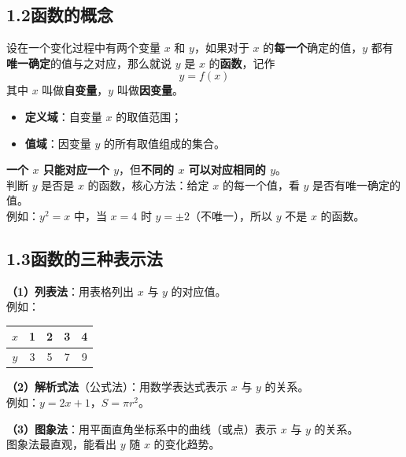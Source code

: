 \documentclass[12pt, a4paper]{ctexart}
\begin{document}
\subsection*{1.2\quad 函数的概念}

\begin{knowledgebox}[什么是函数]
设在一个变化过程中有两个变量 $x$ 和 $y$，如果对于 $x$ 的\textbf{每一个}确定的值，$y$ 都有\textbf{唯一确定}的值与之对应，那么就说 $y$ 是 $x$ 的\textbf{函数}，记作
\[
  y = f(x)
\]
其中 $x$ 叫做\textbf{自变量}，$y$ 叫做\textbf{因变量}。
\begin{itemize}[leftmargin=2em]
  \item \textbf{定义域}：自变量 $x$ 的取值范围；
  \item \textbf{值域}：因变量 $y$ 的所有取值组成的集合。
\end{itemize}
\end{knowledgebox}

\begin{warnbox}
\textbf{一个 $x$ 只能对应一个 $y$}，但\textbf{不同的 $x$ 可以对应相同的 $y$}。\\
判断 $y$ 是否是 $x$ 的函数，核心方法：给定 $x$ 的每一个值，看 $y$ 是否有唯一确定的值。\\
例如：$y^2 = x$ 中，当 $x=4$ 时 $y=\pm 2$（不唯一），所以 $y$ 不是 $x$ 的函数。
\end{warnbox}

\subsection*{1.3\quad 函数的三种表示法}

\begin{knowledgebox}
\textbf{（1）列表法}：用表格列出 $x$ 与 $y$ 的对应值。\\
例如：
\begin{center}
\begin{tabular}{c|cccc}
$x$ & 1 & 2 & 3 & 4 \\\hline
$y$ & 3 & 5 & 7 & 9
\end{tabular}
\end{center}

\textbf{（2）解析式法}（公式法）：用数学表达式表示 $x$ 与 $y$ 的关系。\\
例如：$y = 2x + 1$，$S = \pi r^2$。

\textbf{（3）图象法}：用平面直角坐标系中的曲线（或点）表示 $x$ 与 $y$ 的关系。\\
图象法最直观，能看出 $y$ 随 $x$ 的变化趋势。
\end{knowledgebox}
\end{document}
